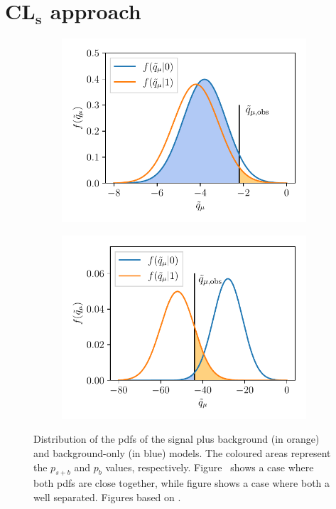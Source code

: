 \section[CL$_s$ approach]{CL$\boldsymbol{_s}$ approach}\label{sec:cls_approach}

\begin{figure}
	\centering
	\begin{subfigure}[b]{0.45\linewidth}
		\centering\includegraphics[width=\textwidth]{cls_1}
		\caption{\label{fig:cls_close}}
	\end{subfigure}%
	\begin{subfigure}[b]{0.45\linewidth}
		\centering\includegraphics[width=\textwidth]{cls_2}
		\caption{\label{fig:cls_far}}
	\end{subfigure}%
	\caption{Distribution of the \glspl{pdf} of the signal plus background (in orange) and background-only (in blue) models. The coloured areas represent the $p_{s+b}$ and $p_{b}$ values, respectively. Figure~ shows a case where both \glspl{pdf} are close together, while figure  shows a case where both a well separated. Figures based on \cite{Cowan:2013pha}.}\label{fig:cls_method}
\end{figure}

